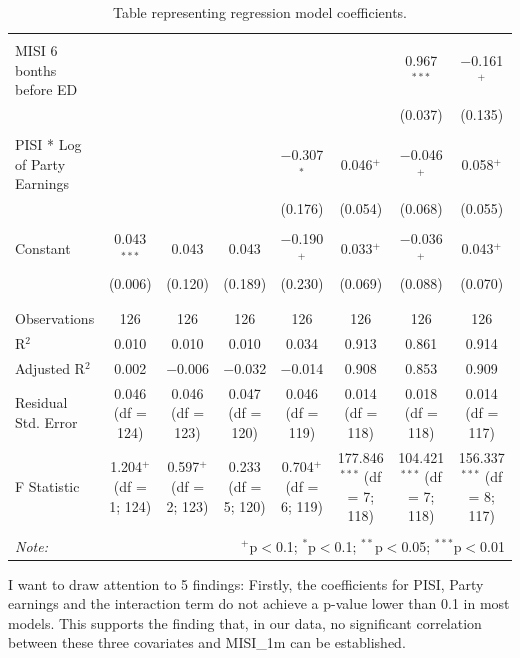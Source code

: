 \documentclass[11pt,a4paper]{article}
\begin{document}
\begin{table}
{\begin{tabular}{@{\extracolsep{50pt}}lccccccc}
      & & & & & & & \\ 
     MISI 6 bonths before ED &  &  &  &  &  & 0.967$^{***}$ & $-$0.161$^{+}$ \\ 
      &  &  &  &  &  & (0.037) & (0.135) \\ 
      & & & & & & & \\ 
     PISI * Log of Party Earnings &  &  &  & $-$0.307$^{*}$ & 0.046$^{+}$ & $-$0.046$^{+}$ & 0.058$^{+}$ \\ 
      &  &  &  & (0.176) & (0.054) & (0.068) & (0.055) \\ 
      & & & & & & & \\ 
     Constant & 0.043$^{***}$ & 0.043 & 0.043 & $-$0.190$^{+}$ & 0.033$^{+}$ & $-$0.036$^{+}$ & 0.043$^{+}$ \\ 
      & (0.006) & (0.120) & (0.189) & (0.230) & (0.069) & (0.088) & (0.070) \\ 
      & & & & & & & \\ 
    \hline \\[-1.8ex] 
    Observations & 126 & 126 & 126 & 126 & 126 & 126 & 126 \\ 
    R$^{2}$ & 0.010 & 0.010 & 0.010 & 0.034 & 0.913 & 0.861 & 0.914 \\ 
    Adjusted R$^{2}$ & 0.002 & $-$0.006 & $-$0.032 & $-$0.014 & 0.908 & 0.853 & 0.909 \\ 
    Residual Std. Error & 0.046 (df = 124) & 0.046 (df = 123) & 0.047 (df = 120) & 0.046 (df = 119) & 0.014 (df = 118) & 0.018 (df = 118) & 0.014 (df = 117) \\ 
    F Statistic & 1.204$^{+}$ (df = 1; 124) & 0.597$^{+}$ (df = 2; 123) & 0.233 (df = 5; 120) & 0.704$^{+}$ (df = 6; 119) & 177.846$^{***}$ (df = 7; 118) & 104.421$^{***}$ (df = 7; 118) & 156.337$^{***}$ (df = 8; 117) \\ 
    \hline 
    \hline \\[-1.8ex] 
    \textit{Note:}  & \multicolumn{7}{r}{$^{+}$p$<$0.1; $^{*}$p$<$0.1; $^{**}$p$<$0.05; $^{***}$p$<$0.01} \\ 
    \end{tabular} 
    }
    \caption{Table representing regression model coefficients.}
    \label{tab:tab5}
\end{table}


I want to draw attention to 5 findings: Firstly, the coefficients for PISI, Party earnings and the interaction term do not achieve a p-value lower than 0.1 in most models. This supports the finding that, in our data, no significant correlation between these three covariates and MISI\_1m can be established.
\end{document}

